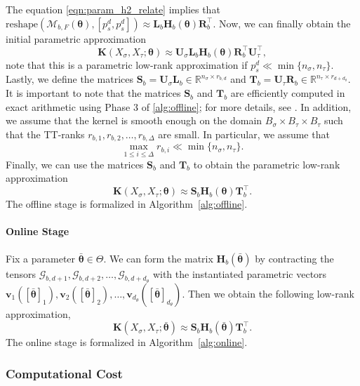 \documentclass[final,3p,times]{elsarticle}
\renewcommand{\vec}[1]{\boldsymbol{#1}}
\newcommand{\mat}[1]{\boldsymbol{#1}}
\newcommand{\R}{\mathbb{R}}
\newcommand{\ten}[1]{\boldsymbol{\mathcal{#1}}}
\begin{document}
The equation \eqref{eqn:param_h2_relate} implies that $\text{reshape}(\ten{M}_{b, F}(\vec{\theta}), [p_s^d, p_s^d]) \approx\mat{L}_{b}\mat{H}_{b}(\vec{\theta})\mat{R}_{b}^{\top}$. Now, we can finally obtain the initial parametric approximation
\begin{equation}
\mat{K}(X_{\sigma}, X_{\tau}; \vec{\theta}) \approx \mat{U}_{\sigma}\mat{L}_{b}\mat{H}_{b}(\vec{\theta})\mat{R}_{b}^{\top}\mat{U}_{\tau}^{\top},
\end{equation}
note that this is a parametric low-rank approximation if $p_s^{d} \ll \min\{n_{\sigma}, n_{\tau}\}$. Lastly, we define the  matrices $\mat{S}_{b} = \mat{U}_{\sigma} \mat{L}_b  \in \R^{n_{\sigma} \times  r_{b, d}}$ and $\mat{T}_{b} =  \mat{U}_{\tau}\mat{R}_{b} \in \R^{n_{\tau} \times r_{d+d_\theta}}$. It is important to note that the matrices $\mat{S}_{b}$ and $\mat{T}_{b}$ are efficiently computed in exact arithmetic using Phase 3 of \ref{alg:offline}; for more details, see \cite{khan2025parametric}. In addition,  we assume that the kernel is smooth enough on the domain $B_{\sigma} \times B_{\tau} \times B_{\tau}$ such that the TT-ranks $r_{b,1}, r_{b,2}, \dots, r_{b,\Delta}$ are small. In particular, we assume that 
$$\max_{1 \le i \le \Delta}r_{b, i} \ll \min\{ n_{\sigma}, n_{\tau}\}.$$
Finally, we can use the matrices $\mat{S}_{b}$ and $\mat{T}_{b}$ to obtain the parametric low-rank approximation
$$ \mat{K}({X}_{\sigma}, X_{\tau}; \vec{\theta}) \approx \mat{S}_{b}\mat{H}_{b}(\vec{\theta})\mat{T}_{b}^{\top}.$$
The offline stage is formalized in Algorithm~\ref{alg:offline}.

\paragraph{Online Stage}
Fix a parameter $\bar{\vec{\theta}} \in \Theta$. We can form the matrix $\mat{H}_b(\bar{\vec{\theta}})$ by contracting the tensors $\ten{G}_{b,d+1}, \ten{G}_{b,d+2}, \dots, \ten{G}_{b,d+d_\theta}$ with the instantiated parametric vectors $\vec{v}_{1}([\bar{\vec{\theta}}]_1), \vec{v}_2([\bar{\vec{\theta}}]_2), \dots, \vec{v}_{d_\theta}([\bar{\vec{\theta}}]_{d_\theta})$. Then we obtain the following low-rank approximation,
$$ \mat{K}({X}_{\sigma}, {X}_{\tau}; \bar{\vec{\theta}}) \approx \mat{S}_{b} \mat{H}_b(\bar{\vec{\theta}})\mat{T}_{b}^{\top}.$$
The online stage is formalized in Algorithm~\ref{alg:online}.


\subsubsection{Computational Cost}
\end{document}

